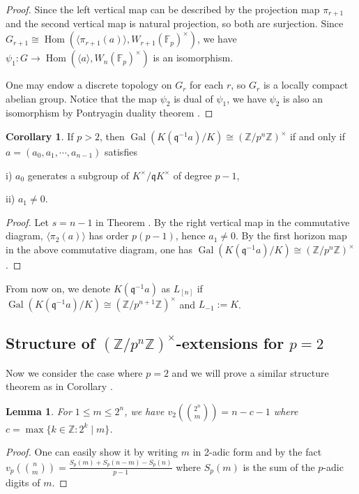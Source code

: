 \documentclass{proc-l}
\newtheorem{lemma}[theorem]{Lemma}
\theoremstyle{definition}
\newtheorem{corollary}[theorem]{Corollary}
\theoremstyle{remark}
\numberwithin{equation}{section}
\DeclareMathOperator{\Gal}{Gal}
\DeclareMathOperator{\Hom}{Hom}
\begin{document}
{\begin{proof}
Since the left vertical map can be described by the projection map $\pi_{r+1}$ and the second vertical map is natural projection, so both are surjection. Since $G_{r+1}\cong \Hom(\langle \pi_{r+1}(a)\rangle,W_{r+1}(\mathbb F_p)^\times)$, we have $\psi_1:G\rightarrow \Hom(\langle a\rangle,W_n(\mathbb F_p)^\times)$ is an isomorphism.

One may endow a discrete topology on $G_r$ for each $r$, so $G_r$ is a locally compact abelian group. %
Notice that the map $\psi_2$ is dual of $\psi_1$, we have $\psi_2$ is also an isomorphism by Pontryagin duality theorem \cite[Chapter 4]{morris_1977}.
\end{proof}
\begin{corollary}\label{2.10}
    If $p>2$, then $\Gal(K(\mathfrak q^{-1}a)/K)\cong(\mathbb Z/p^n\mathbb Z)^\times$ if and only if $a=(a_0,a_1,\cdots,a_{n-1})$ satisfies

    i) $a_0$ generates a subgroup of $K^\times/\mathfrak qK^\times$ of degree $p-1$,
    
    ii) $a_1\neq0$.


\end{corollary}
\begin{proof}
    Let $s=n-1$ in Theorem \boxed{\ref{038}}. By the right vertical map in the commutative diagram, $\langle\pi_2(a)\rangle$ has order $p(p-1)$, hence $a_1\neq0$. By the first horizon map in the above commutative diagram, one has $\Gal(K(\mathfrak q^{-1}a)/K)\cong(\mathbb Z/p^n\mathbb Z)^\times$. 
\end{proof} 

From now on, we denote $K(\mathfrak q^{-1}a)$ as $L_{[n]}$ if $\Gal(K(\mathfrak q^{-1}a)/K)\cong(\mathbb Z/p^{n+1}\mathbb Z)^\times$ and $L_{-1}:=K$.
\subsection{Structure of $(\mathbb Z/p^n\mathbb Z)^\times$-extensions for $p=2$}\label{3.2}
Now we consider the case where $p=2$ and we will prove a similar structure theorem as in Corollary \boxed{\ref{2.10}}.

\begin{lemma}{\label{lemma9}}
For $1\leq m\leq 2^n$, we have $v_2(\binom{2^n}{m})=n-c-1$ where $c=\max\{k\in\mathbb Z:2^k\mid m\}$.
\end{lemma}
\begin{proof}
One can easily show it by writing $m$ in 2-adic form and by the fact $v_p(\binom{n}{m})=\frac{S_p(m)+S_p(n-m)-S_p(n)}{p-1}$ where $S_p(m)$ is the sum of the $p$-adic digits of $m$.
\end{proof}


}
\end{document}
